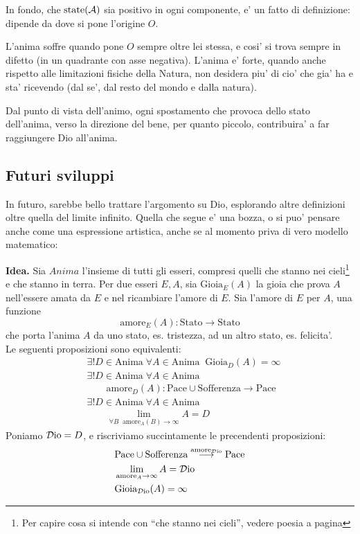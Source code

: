 In fondo, che $\textrm{state}(\mathcal{A})$ sia positivo in ogni componente, e' un fatto di definizione: dipende da dove si pone l'origine $O$.

L'anima soffre quando pone $O$ sempre oltre lei stessa, e cosi' si trova sempre in difetto (in un quadrante con asse negativa). L'anima e' forte, quando anche rispetto alle limitazioni fisiche della Natura, non desidera piu' di cio' che gia' ha e sta' ricevendo (dal se', dal resto del mondo e dalla natura).

Dal punto di vista dell'animo, ogni spostamento che provoca dello stato dell'anima, verso la direzione del bene, per quanto piccolo, contribuira' a far raggiungere Dio all'anima.


\subsection{Futuri sviluppi}
\label{FuturiSviluppiProcAssiomatico}
In futuro, sarebbe bello trattare l'argomento su Dio, esplorando altre definizioni oltre quella del limite infinito.
Quella che segue e' una bozza, o si puo' pensare anche come una espressione artistica, anche se al momento priva di vero modello matematico:

    \textbf{Idea. } Sia $\textit{Anima}$ l'insieme di tutti gli esseri, compresi quelli che stanno nei cieli\footnote{Per capire cosa si intende con ``che stanno nei cieli'', vedere poesia a pagina \pageref{DioScientificamentePoesia}} e che stanno in terra. Per due esseri $E,A$, sia $\textrm{Gioia}_E(A)$ la gioia che prova $A$ nell'essere amata da $E$ e nel ricambiare l'amore di $E$. Sia l'amore di $E$ per $A$, una funzione 
    \[\textrm{amore}_E(A):\textrm{Stato}\longrightarrow\textrm{Stato}\]
    che porta l'anima $A$ da uno stato, es. tristezza, ad un altro stato, es. felicita'.\\
    Le seguenti proposizioni sono equivalenti:
    \begin{align}
        &\exists ! D \in \textrm{Anima}\;\forall A \in \textrm{Anima}\;\; \textrm{Gioia}_D(A) = \infty \\
        &\exists ! D \in \textrm{Anima}\;\forall A \in \textrm{Anima}\;\;\nonumber\\
        &\qquad\textrm{amore}_D(A): \textrm{Pace}\cup\textrm{Sofferenza} \longrightarrow \textrm{Pace}\\
        &\exists ! D \in \textrm{Anima}\;\forall A \in \textrm{Anima} \nonumber\\
        &\qquad \lim_{\forall B\;\;\textrm{amore}_A(B)\to\infty} A = D
    \end{align}
    Poniamo $\mathcal{D}\textrm{io}=D$, e riscriviamo succintamente le precendenti proposizioni:
    \begin{align*}
        &\textrm{Pace}\cup\textrm{Sofferenza} \stackrel{\textrm{amore}_{\mathcal{D}\textrm{io}}}{\longrightarrow} \textrm{Pace}\\
        &\lim_{\textrm{amore}_A\to\infty}A = \mathcal{D}\textrm{io}\\
        &\textrm{Gioia}_{\mathcal{D}\textrm{io}}(A) = \infty
    \end{align*}

